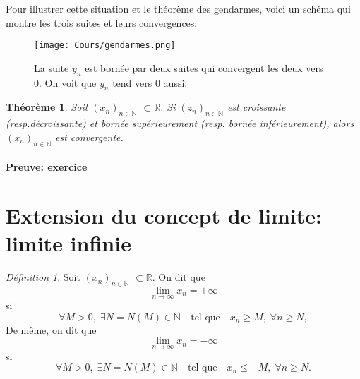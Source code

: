 \documentclass[oneside,12pt,french,table]{book}
\theoremstyle{definition}
\theoremstyle{plain}
\newtheorem{theorem}[definition]{Théorème}
\theoremstyle{remark}
\newtheorem{defi}[definition]{Définition}
\newcommand{\Nn}{{\mathbb{N}}}
\newcommand{\Rr}{{\mathbb{R}}}
\begin{document}
Pour illustrer cette situation et le théorème des gendarmes, voici un schéma qui montre les trois suites et leurs convergences:

\begin{figure}[H]
    \centering
    \texttt{[image: Cours/gendarmes.png]}
    \caption{La suite $y_n$ est bornée par deux suites qui convergent les deux vers 0. On voit que $y_n$ tend vers 0 aussi.}
    \label{fig:Cours/gendarmes.png}
\end{figure}

\begin{theorem}\label{4.5}
    Soit $(x_n)_{n\in\Nn}$ $\subset \Rr$. Si $(z_n)_{n\in\Nn}$ est croissante (resp.décroissante) et bornée supérieurement (resp. bornée inférieurement), alors $(x_n)_{n\in\Nn}$ est convergente.
\end{theorem}

\paragraph{Preuve: exercice}
\section{Extension du concept de limite: limite infinie}\label{limite infinie suite}
\begin{defi}
    

Soit $(x_n)_{n\in\Nn}$ $\subset \Rr$. On dit que 
\begin{equation*}
    \lim_{n\rightarrow\infty}x_n=+\infty
\end{equation*}
si
\begin{equation*}
    \forall M>0, \; \exists N=N(M)\in\Nn \quad\text{tel que} \quad x_n\geq M, \; \forall n\geq N,
\end{equation*}
De même, on dit que 
\begin{equation*}
    \lim_{n\rightarrow\infty}x_n=-\infty
\end{equation*}
si
\begin{equation*}
    \forall M>0, \; \exists N=N(M)\in\Nn \quad \text{tel que} \quad x_n\leq -M, \;\forall n\geq N.
\end{equation*}
\end{defi}
\end{document}
